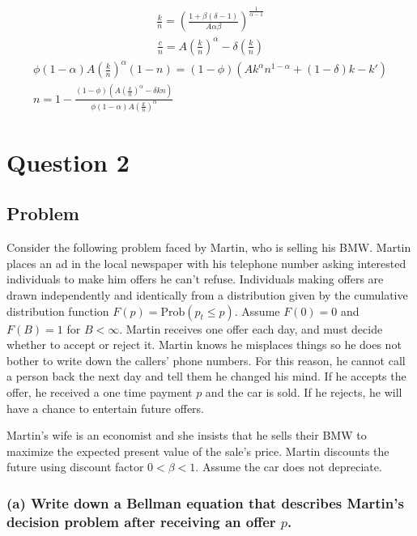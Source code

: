 \documentclass[10pt, a4paper]{article}
\begin{document}
    \begin{gather*}
      \boxed{\frac{k}{n} = (\frac{1+\beta(\delta-1)}{A\alpha\beta})^{\frac{1}{\alpha-1}}}
    \end{gather*}
    \begin{gather*}
      \boxed{\frac{c}{n} = A(\frac{k}{n})^{\alpha}-\delta(\frac{k}{n})}
    \end{gather*}
    \begin{gather*}
      \phi(1-\alpha)A(\frac{k}{n})^{\alpha}(1-n) = (1-\phi)(Ak^{\alpha}n^{1-\alpha}+(1-\delta)k-k')\\
      \boxed{n = 1-\frac{(1-\phi)(A(\frac{k}{n})^{\alpha}-\delta{k}{n})}{\phi(1-\alpha)A(\frac{k}{n})^{\alpha}}}
    \end{gather*}

\section*{Question 2}
  \subsection*{Problem}
    Consider the following problem faced by Martin, who is selling his BMW. Martin places an ad in the local newspaper with his telephone number asking interested individuals to make him offers he can't refuse. Individuals making offers are drawn independently and identically from a distribution given by the cumulative distribution function $F(p) = \text{Prob}(p_t \leq p)$. Assume $F(0) = 0$ and $F(B) = 1$ for $B < \infty$. Martin receives one offer each day, and must decide whether to accept or reject it. Martin knows he misplaces things so he does not bother to write down the callers' phone numbers. For this reason, he cannot call a person back the next day and tell them he changed his mind. If he accepts the offer, he received a one time payment $p$ and the car is sold. If he rejects, he will have a chance to entertain future offers.

    Martin's wife is an economist and she insists that he sells their BMW to maximize the expected present value of the sale's price. Martin discounts the future using discount factor $0 < \beta < 1$. Assume the car does not depreciate.

    \subsubsection*{(a) Write down a Bellman equation that describes Martin's decision problem after receiving an offer $p$.}
\end{document}

